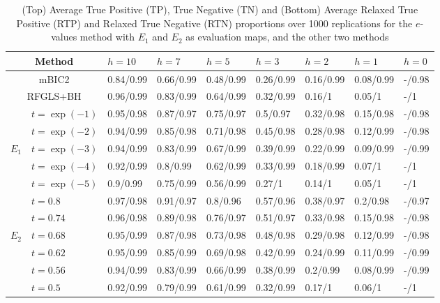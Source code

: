 \begin{table}[b]
\begin{scriptsize}
\vspace{1em}

        \begin{tabular}{c|l|lllllll}
    \hline
    \multicolumn{2}{c|}{Method}          & $h = 10$    & $h = 7$     & $h = 5$     & $h = 3$     & $h = 2$     & $h = 1$     & $h = 0$     \\ \hline
    \multicolumn{2}{c|}{mBIC2}           & 0.84/0.99 & 0.66/0.99 & 0.48/0.99 & 0.26/0.99 & 0.16/0.99 & 0.08/0.99 & -/0.98 \\
    \multicolumn{2}{c|}{RFGLS+BH}        & 0.96/0.99 & 0.83/0.99 & 0.64/0.99 & 0.32/0.99 & 0.16/1    & 0.05/1    & -/1    \\ \hline
    ~        & $t = \exp(-1)$ & 0.95/0.98 & 0.87/0.97 & 0.75/0.97 & 0.5/0.97  & 0.32/0.98 & 0.15/0.98 & -/0.98 \\
    ~        & $t = \exp(-2)$ & 0.94/0.99 & 0.85/0.98 & 0.71/0.98 & 0.45/0.98 & 0.28/0.98 & 0.12/0.99 & -/0.98 \\
    $E_1$    & $t = \exp(-3)$ & 0.94/0.99 & 0.83/0.99 & 0.67/0.99 & 0.39/0.99 & 0.22/0.99 & 0.09/0.99 & -/0.99    \\
    ~        & $t = \exp(-4)$ & 0.92/0.99 & 0.8/0.99  & 0.62/0.99 & 0.33/0.99 & 0.18/0.99 & 0.07/1    & -/1    \\
    ~        & $t = \exp(-5)$ & 0.9/0.99  & 0.75/0.99 & 0.56/0.99 & 0.27/1    & 0.14/1    & 0.05/1    & -/1    \\ \hline
    ~        & $t = 0.8$    & 0.97/0.98 & 0.91/0.97 & 0.8/0.96  & 0.57/0.96 & 0.38/0.97 & 0.2/0.98  & -/0.97 \\
    ~        & $t = 0.74$   & 0.96/0.98 & 0.89/0.98 & 0.76/0.97 & 0.51/0.97 & 0.33/0.98 & 0.15/0.98 & -/0.98 \\
    $E_2$    & $t = 0.68$   & 0.95/0.99 & 0.87/0.98 & 0.73/0.98 & 0.48/0.98 & 0.29/0.98 & 0.12/0.99 & -/0.98 \\
    ~        & $t = 0.62$   & 0.95/0.99 & 0.85/0.99 & 0.69/0.98 & 0.42/0.99 & 0.24/0.99 & 0.11/0.99 & -/0.99    \\
    ~        & $t = 0.56$   & 0.94/0.99 & 0.83/0.99 & 0.66/0.99 & 0.38/0.99 & 0.2/0.99  & 0.08/0.99 & -/0.99    \\
    ~        & $t = 0.5$    & 0.92/0.99 & 0.79/0.99 & 0.61/0.99 & 0.32/0.99 & 0.17/1    & 0.06/1    & -/1    \\ \hline
    \end{tabular}
\end{scriptsize}
\caption{(Top) Average True Positive (TP), True Negative (TN) and (Bottom) Average Relaxed True Positive (RTP) and Relaxed True Negative (RTN) proportions over 1000 replications for the $e$-values method with $E_1$ and $E_2$ as evaluation maps, and the other two methods}
\label{table:SNPSimTable0}
\end{table}
%


